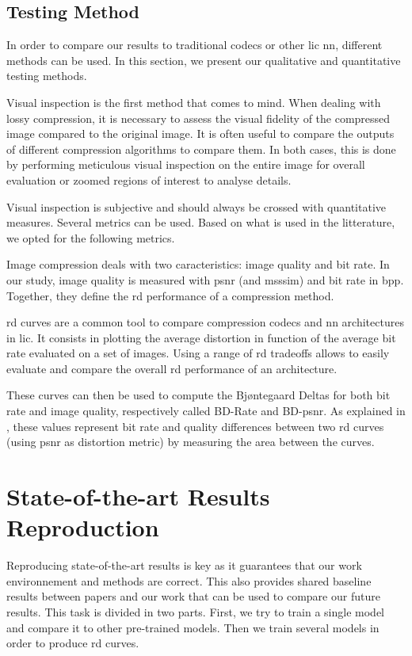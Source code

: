 \subsection{Testing Method}
In order to compare our results to traditional codecs or other \acrshort{lic} \acrshort{nn}, different methods can be used. In this section, we present our qualitative and quantitative testing methods.

Visual inspection is the first method that comes to mind. When dealing with lossy compression, it is necessary to assess the visual fidelity of the compressed image compared to the original image. It is often useful to compare the outputs of different compression algorithms to compare them. In both cases, this is done by performing meticulous visual inspection on the entire image for overall evaluation or zoomed regions of interest to analyse details.

Visual inspection is subjective and should always be crossed with quantitative measures. Several metrics can be used. Based on what is used in the litterature, we opted for the following metrics.

Image compression deals with two caracteristics: image quality and bit rate. In our study, image quality is measured with \acrfull{psnr} (and \acrfull{msssim}) and bit rate in \acrfull{bpp}. Together, they define the \acrfull{rd} performance of a compression method.

\acrshort{rd} curves are a common tool to compare compression codecs and \acrshort{nn} architectures in \acrshort{lic}. It consists in plotting the average distortion in function of the average bit rate evaluated on a set of images. Using a range of \acrshort{rd} tradeoffs allows to easily evaluate and compare the overall \acrshort{rd} performance of an architecture.

These curves can then be used to compute the Bjøntegaard Deltas for both bit rate and image quality, respectively called BD-Rate and BD-\acrshort{psnr}. As explained in \cite{barman2024bjontegaarddeltabdtutorial}, these values represent bit rate and quality differences between two \acrshort{rd} curves (using \acrshort{psnr} as distortion metric) by measuring the area between the curves. %

\section{State-of-the-art Results Reproduction}
Reproducing state-of-the-art results is key as it guarantees that our work environnement and methods are correct. This also provides shared baseline results between papers and our work that can be used to compare our future results. This task is divided in two parts. First, we try to train a single model and compare it to other pre-trained models. Then we train several models in order to produce \acrshort{rd} curves.

